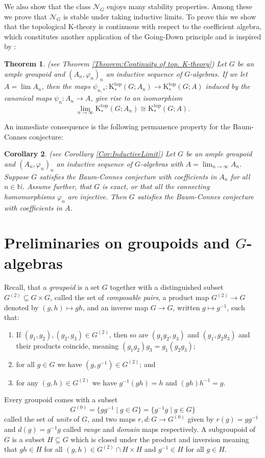 \documentclass[reqno,oneside,a4paper,11pt]{amsart}
\theoremstyle{theorem}
\newtheorem{thmx}{Theorem}
\newtheorem{corx}[thmx]{Corollary}
\theoremstyle{definition}
\newcommand{\K}{\mathrm K}
\newcommand{\NN}{\mathbb N}
\begin{document}
	We also show that the class $\mathcal{N}_G$ enjoys many stability properties. Among these we prove that $\mathcal{N}_G$ is stable under taking inductive limits. To prove this we show that the topological $\K$-theory is continuous with respect to the coefficient algebra, which constitutes another application of the Going-Down principle and is inspired by \cite[§7]{MR1836047}:
	\begin{thmx}(see Theorem \ref{Theorem:Continuity of top. K-theory})
		Let $G$ be an ample groupoid and $(A_n,\varphi_n)_n$ an inductive sequence of $G$-algebras. If we let $A=\lim A_n$, then the maps $\psi_{n,*}:\K_*^{\mathrm{top}}(G;A_n)\rightarrow \K_*^{\mathrm{top}}(G;A)$ induced by the canonical maps $\psi_n:A_n\rightarrow A$, give rise to an isomorphism
		$$\lim_{n\rightarrow\infty}\K_*^{\mathrm{top}}(G;A_n)\cong \K_*^{\mathrm{top}}(G;A).$$
	\end{thmx}
	An immediate consequence is the following permanence property for the Baum-Connes conjecture:
	\begin{corx}(see Corollary \ref{Cor:InductiveLimit})
		Let $G$ be an ample groupoid and $(A_n,\varphi_n)_n$ an inductive sequence of $G$-algebras with $A=\lim_{n\rightarrow\infty}A_n$. Suppose $G$ satisfies the Baum-Connes conjecture with coefficients in $A_n$ for all $n\in\NN$. Assume further, that $G$ is exact, or that all the connecting homomorphisms $\varphi_n$ are injective. Then $G$ satisfies the Baum-Connes conjecture with coefficients in $A$.
	\end{corx}
	
	

	\section{Preliminaries on groupoids and $G$-algebras}
	Recall, that a \textit{groupoid} is a set $G$ together with a distinguished subset $G^{(2)}\subseteq G\times G$, called the set of \textit{composable pairs}, a product map $G^{(2)}\rightarrow G$ denoted by $(g,h)\mapsto gh$, and an inverse map $G\rightarrow G$, written $g\mapsto g^{-1}$, such that:
	\begin{enumerate}
		\item If $(g_1,g_2),(g_2,g_3)\in G^{(2)}$, then so are $(g_1g_2,g_3)$ and $(g_1,g_2g_3)$ and their products coincide, meaning $(g_1g_2)g_3=g_1(g_2g_3)$;
		\item for all $g\in G$ we have $(g,g^{-1})\in G^{(2)}$; and
		\item for any $(g,h)\in G^{(2)}$ we have $g^{-1}(gh)=h$ and $(gh)h^{-1}=g$.
	\end{enumerate}
	Every groupoid comes with a subset
	$$G^{(0)}=\lbrace gg^{-1}\mid g\in G\rbrace=\lbrace g^{-1}g\mid g\in G\rbrace$$
	called the set of \textit{units} of $G$, and two maps $r,d:G\rightarrow G^{(0)}$ given by
	$r(g)=gg^{-1}$ and $d(g)=g^{-1}g$ called \textit{range} and \textit{domain} maps respectively.
	A subgroupoid of $G$ is a subset $H\subseteq G$ which is closed under the product and inversion meaning that $gh\in H$ for all $(g,h)\in G^{(2)}\cap H\times H$ and $g^{-1}\in H$ for all $g\in H$.
	
\end{document}
